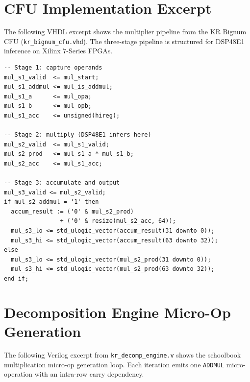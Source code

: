 \documentclass[11pt,a4paper]{article}
\begin{document}
\appendix

\section{CFU Implementation Excerpt}
\label{app:cfu}

The following VHDL excerpt shows the multiplier pipeline from the KR Bignum
CFU (\texttt{kr\_bignum\_cfu.vhd}).  The three-stage pipeline is structured
for DSP48E1 inference on Xilinx 7-Series FPGAs.

\begin{lstlisting}[style=vhdl,caption={Multiplier pipeline (3 stages) from \texttt{kr\_bignum\_cfu.vhd}.},label=lst:mul-pipeline]
-- Stage 1: capture operands
mul_s1_valid  <= mul_start;
mul_s1_addmul <= mul_is_addmul;
mul_s1_a      <= mul_opa;
mul_s1_b      <= mul_opb;
mul_s1_acc    <= unsigned(hireg);

-- Stage 2: multiply (DSP48E1 infers here)
mul_s2_valid  <= mul_s1_valid;
mul_s2_prod   <= mul_s1_a * mul_s1_b;
mul_s2_acc    <= mul_s1_acc;

-- Stage 3: accumulate and output
mul_s3_valid <= mul_s2_valid;
if mul_s2_addmul = '1' then
  accum_result := ('0' & mul_s2_prod)
                + ('0' & resize(mul_s2_acc, 64));
  mul_s3_lo <= std_ulogic_vector(accum_result(31 downto 0));
  mul_s3_hi <= std_ulogic_vector(accum_result(63 downto 32));
else
  mul_s3_lo <= std_ulogic_vector(mul_s2_prod(31 downto 0));
  mul_s3_hi <= std_ulogic_vector(mul_s2_prod(63 downto 32));
end if;
\end{lstlisting}


\section{Decomposition Engine Micro-Op Generation}
\label{app:decomp}

The following Verilog excerpt from \texttt{kr\_decomp\_engine.v} shows the
schoolbook multiplication micro-op generation loop.  Each iteration emits
one \texttt{ADDMUL} micro-operation with an intra-row carry dependency.
\end{document}
